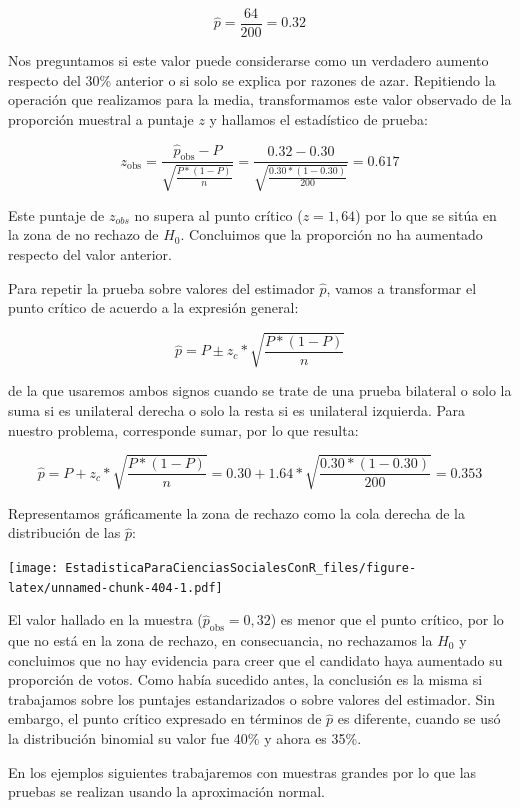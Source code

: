\documentclass[]{book}
\begin{document}
\[\widehat{p} = \frac{64}{200} = 0.32\]

Nos preguntamos si este valor puede considerarse como un verdadero
aumento respecto del 30\% anterior o si solo se explica por razones de
azar. Repitiendo la operación que realizamos para la media,
transformamos este valor observado de la proporción muestral a puntaje
\(z\) y hallamos el estadístico de prueba:

\[z_{\text{obs}} = \frac{{\widehat{p}}_{\text{obs}} - P}{\sqrt{\frac{P*(1 - P)}{n}}} = \frac{0.32 - 0.30}{\sqrt{\frac{0.30*(1 - 0.30)}{200}}} = 0.617\]

Este puntaje de \(z_{obs}\) no supera al punto crítico (\(z=1,64\)) por lo
que se sitúa en la zona de no rechazo de \(H_{0}\). Concluimos que la
proporción no ha aumentado respecto del valor anterior.

Para repetir la prueba sobre valores del estimador \(\widehat{p}\), vamos
a transformar el punto crítico de acuerdo a la expresión general:

\[\widehat{p} = P \pm z_{c}*\sqrt{\frac{P*(1 - P)}{n}}\]

de la que usaremos ambos signos cuando se trate de una prueba bilateral
o solo la suma si es unilateral derecha o solo la resta si es unilateral izquierda. Para nuestro problema, corresponde sumar, por lo que resulta:

\[\widehat{p} = P + z_{c}*\sqrt{\frac{P*(1 - P)}{n}} = 0.30 + 1.64*\sqrt{\frac{0.30*(1 - 0.30)}{200}} = 0.353\]

Representamos gráficamente la zona de rechazo como la cola derecha de la distribución de las \(\widehat{p}\):

\texttt{[image: EstadisticaParaCienciasSocialesConR\_files/figure-latex/unnamed-chunk-404-1.pdf]}

El valor hallado en la muestra (\({\widehat{p}}_{\text{obs}} = 0,32\)) es
menor que el punto crítico, por lo que no está en la zona de rechazo, en consecuancia, no rechazamos la \(H_{0}\) y concluimos que no hay evidencia para creer que el
candidato haya aumentado su proporción de votos. Como había sucedido
antes, la conclusión es la misma si trabajamos sobre los puntajes
estandarizados o sobre valores del estimador. Sin embargo, el punto
crítico expresado en términos de \(\widehat{p}\) es diferente, cuando se
usó la distribución binomial su valor fue 40\% y ahora es 35\%.

En los ejemplos siguientes trabajaremos con muestras grandes por lo que
las pruebas se realizan usando la aproximación normal.
\end{document}
